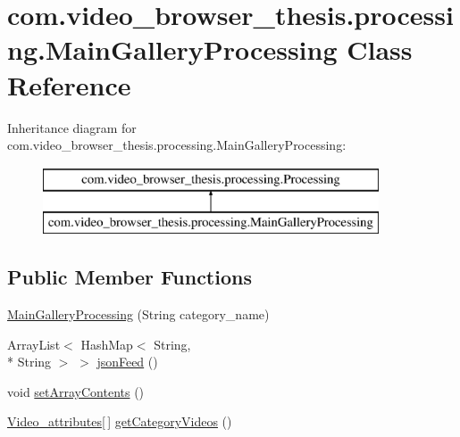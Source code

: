 \hypertarget{classcom_1_1video__browser__thesis_1_1processing_1_1_main_gallery_processing}{\section{com.\-video\-\_\-browser\-\_\-thesis.\-processing.\-Main\-Gallery\-Processing Class Reference}
\label{classcom_1_1video__browser__thesis_1_1processing_1_1_main_gallery_processing}
}
Inheritance diagram for com.\-video\-\_\-browser\-\_\-thesis.\-processing.\-Main\-Gallery\-Processing\-:\begin{figure}[H]
\begin{center}
\leavevmode
\includegraphics[height=2.000000cm]{classcom_1_1video__browser__thesis_1_1processing_1_1_main_gallery_processing}
\end{center}
\end{figure}
\subsection*{Public Member Functions}
\begin{DoxyCompactItemize}
\item 
\hyperlink{classcom_1_1video__browser__thesis_1_1processing_1_1_main_gallery_processing_a405fe9a88bbc3cb047d7a61495b55e18}{Main\-Gallery\-Processing} (String category\-\_\-name)
\item 
Array\-List$<$ Hash\-Map$<$ String, \\*
String $>$ $>$ \hyperlink{classcom_1_1video__browser__thesis_1_1processing_1_1_main_gallery_processing_a90f2d11f4c0b61f7847054becf8c43a8}{json\-Feed} ()
\item 
void \hyperlink{classcom_1_1video__browser__thesis_1_1processing_1_1_main_gallery_processing_a6ecb1e6d381d158c3271177917c30a65}{set\-Array\-Contents} ()
\item 
\hyperlink{classcom_1_1video__browser__thesis_1_1elements_1_1_video__attributes}{Video\-\_\-attributes}\mbox{[}$\,$\mbox{]} \hyperlink{classcom_1_1video__browser__thesis_1_1processing_1_1_main_gallery_processing_a4d93ba3178808de59698e1bcc2292189}{get\-Category\-Videos} ()
\end{DoxyCompactItemize}


